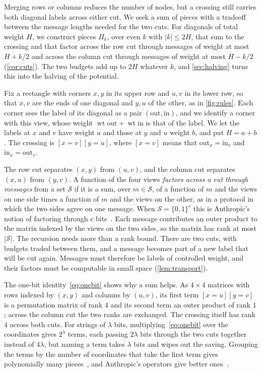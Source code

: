 \documentclass[11pt]{article}
\theoremstyle{definition}
\theoremstyle{definition}
\theoremstyle{remark}
\newcommand{\wt}{\operatorname{wt}}
\newcommand{\out}{\mathrm{out}}
\newcommand{\inn}{\mathrm{in}}
\begin{document}
Merging rows or columns reduces the number of nodes, but a crossing still carries both diagonal labels across either cut. We seek a sum of pieces with a tradeoff between the message lengths needed for the two cuts. For diagonals of total weight $H$, we construct pieces $\Pi_k$, over even $k$ with $|k|\le2H$, that sum to the crossing and that factor across the row cut through messages of weight at most $H+k/2$ and across the column cut through messages of weight at most $H-k/2$ (\cref{cor:cuts}). The two budgets add up to $2H$ whatever $k$, and \cref{sec:halving} turns this into the halving of the potential.

Fix a rectangle with corners $x,y$ in its upper row and $u,v$ in its lower row, so that $x,v$ are the ends of one diagonal and $y,u$ of the other, as in \cref{fig:rules}. Each corner sees the label of its diagonal as a pair $(\out,\inn)$, and we identify a corner with this view, whose weight $\wt\out+\wt\inn$ is that of the label. We let the labels at $x$ and $v$ have weight $a$ and those at $y$ and $u$ weight $b$, and put $H=a+b$. The crossing is $[x=v][y=u]$, where $[x=v]$ means that $\out_x=\inn_v$ and $\inn_x=\out_v$.

The row cut separates $(x,y)$ from $(u,v)$, and the column cut separates $(x,u)$ from $(y,v)$. A function of the four views \emph{factors across a cut through messages} from a set $\mathcal S$ if it is a sum, over $m\in\mathcal S$, of a function of $m$ and the views on one side times a function of $m$ and the views on the other, as in a protocol in which the two sides agree on one message. When $\mathcal S=\{0,1\}^c$ this is Anthropic's notion of factoring through $c$ bits~\cite{Ant26}. Each message contributes an outer product to the matrix indexed by the views on the two sides, so the matrix has rank at most $|\mathcal S|$. The recursion needs more than a rank bound. There are two cuts, with budgets traded between them, and a message becomes part of a new label that will be cut again. Messages must therefore be labels of controlled weight, and their factors must be computable in small space (\cref{lem:transport}).

The one-bit identity~\eqref{eq:onebit} shows why a sum helps. As $4\times4$ matrices with rows indexed by $(x,y)$ and columns by $(u,v)$, its first term $[x=u][y=v]$ is a permutation matrix of rank $4$ and its second term an outer product of rank $1$; across the column cut the two ranks are exchanged. The crossing itself has rank $4$ across both cuts. For strings of $\lambda$ bits, multiplying~\eqref{eq:onebit} over the coordinates gives $2^\lambda$ terms, each passing $2\lambda$ bits through the two cuts together instead of $4\lambda$, but naming a term takes $\lambda$ bits and wipes out the saving. Grouping the terms by the number of coordinates that take the first term gives polynomially many pieces~\cite[Appendix~H]{Ant26}, and Anthropic's operators give better ones~\cite[Appendix~B]{Ant26}.
\end{document}
